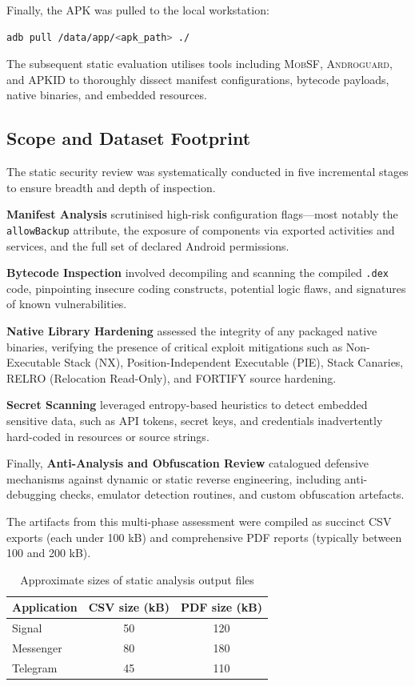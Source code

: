 \documentclass[a4paper,12pt]{report}
\begin{document}
Finally, the APK was pulled to the local workstation:
\begin{lstlisting}[language=bash]
adb pull /data/app/<apk_path> ./
\end{lstlisting}

The subsequent static evaluation utilises tools including \textsc{MobSF}, \textsc{Androguard}, and \textsc{APKID} to thoroughly dissect manifest configurations, bytecode payloads, native binaries, and embedded resources.

\subsection{Scope and Dataset Footprint}

The static security review was systematically conducted in five incremental stages to ensure breadth and depth of inspection.

\textbf{Manifest Analysis} scrutinised high-risk configuration flags—most notably the \lstinline{allowBackup} attribute, the exposure of components via exported activities and services, and the full set of declared Android permissions.

\textbf{Bytecode Inspection} involved decompiling and scanning the compiled \texttt{.dex} code, pinpointing insecure coding constructs, potential logic flaws, and signatures of known vulnerabilities.

\textbf{Native Library Hardening} assessed the integrity of any packaged native binaries, verifying the presence of critical exploit mitigations such as Non-Executable Stack (NX), Position-Independent Executable (PIE), Stack Canaries, RELRO (Relocation Read-Only), and \textsc{FORTIFY} source hardening.

\textbf{Secret Scanning} leveraged entropy-based heuristics to detect embedded sensitive data, such as API tokens, secret keys, and credentials inadvertently hard-coded in resources or source strings.

Finally, \textbf{Anti-Analysis and Obfuscation Review} catalogued defensive mechanisms against dynamic or static reverse engineering, including anti-debugging checks, emulator detection routines, and custom obfuscation artefacts.


The artifacts from this multi-phase assessment were compiled as succinct CSV exports (each under 100 kB) and comprehensive PDF reports (typically between 100 and 200 kB).

\begin{table}[H]
\centering
\begin{tabular}{|l|c|c|}
\hline
\textbf{Application} & \textbf{CSV size (kB)} & \textbf{PDF size (kB)} \\
\hline
Signal & 50 & 120 \\
Messenger & 80 & 180 \\
Telegram & 45 & 110 \\
\hline
\end{tabular}
\caption{Approximate sizes of static analysis output files}
\label{tab:static-sizes}
\end{table}
\end{document}

